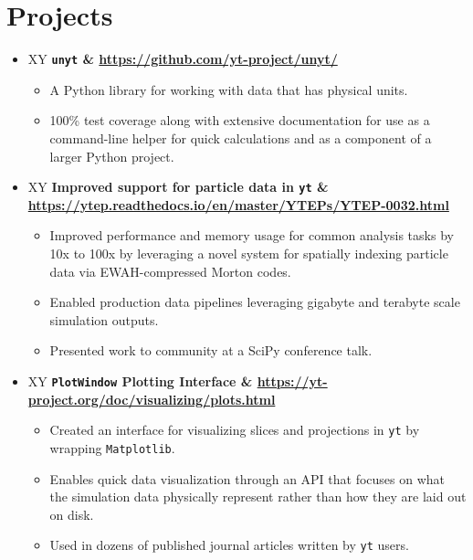 \documentclass[10pt,letterpaper]{article}
\newcommand{\textline}[2]{
  \begin{tabularx}{\textwidth}{XY}
  #1 & #2
  \end{tabularx}
}
\begin{document}
\section*{Projects}

\begin{itemize}

  \item[] \textline{\bf
    \texttt{unyt}}{\href{https://github.com/yt-project/unyt/}{\small https://github.com/yt-project/unyt/}}
    \begin{itemize}
      \item A Python library for working with data that has physical
        units.
      \item 100\% test coverage along with extensive documentation for use as a
        command-line helper for quick calculations and as a component of a
        larger Python project.
    \end{itemize}
  \item[] \textline{\bf Improved support for particle data in
    \texttt{yt}}{\scriptsize \href{https://ytep.readthedocs.io/en/master/YTEPs/YTEP-0032.html}{https://ytep.readthedocs.io/en/master/YTEPs/YTEP-0032.html}}
    \begin{itemize}
      \item Improved performance and memory usage for common analysis tasks by
        10x to 100x by leveraging a novel system for spatially indexing particle
        data via EWAH-compressed Morton codes.
      \item Enabled production data pipelines leveraging gigabyte and
        terabyte scale simulation outputs.
      \item Presented work to community at a SciPy conference talk.
    \end{itemize}
  \item[] \textline{\bf\texttt{PlotWindow} Plotting Interface}{\href{https://yt-project.org/doc/visualizing/plots.html}{https://yt-project.org/doc/visualizing/plots.html}}
    \begin{itemize}
      \item Created an interface for visualizing slices and projections in
        \texttt{yt} by wrapping \texttt{Matplotlib}.
      \item Enables quick data visualization through an API that
        focuses on what the simulation data physically represent rather than how
        they are laid out on disk.
      \item Used in dozens of published journal articles
        written by \texttt{yt} users.
    \end{itemize}

\end{itemize}
\end{document}
